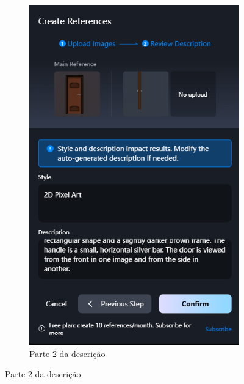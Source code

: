 \begin{figure}[htbp]
\begin{subfigure}{0.4\linewidth}
        \includegraphics[width=1\linewidth]{figs/vidu/tela_referencia_porta_2.PNG}
        \caption{\small Parte 2 da descrição}
        \label{fig:viduReferenciaPortaA2}
    \end{subfigure}
\end{figure}

